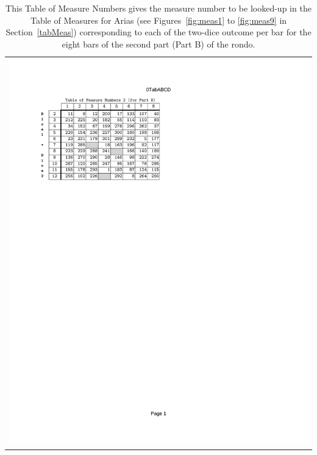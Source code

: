 \documentclass[a4paper,x11names,svgnames,10pt]{article}
\begin{document}
{\begin{table}[H]
	\centering
	\begin{tabular}{c}
		\centering
		\includegraphics[clip=true,trim=0.75in 7.50in 3.75in 1.10in,scale=0.90]{0TAB-B}
	\end{tabular}
	\caption{This Table of Measure Numbers gives the measure number to be looked-up in the Table of Measures for Arias (see Figures~\ref{fig:meas1} to \ref{fig:meas9} in Section~\ref{tabMeas}) corresponding to each of the two-dice outcome per bar for the eight bars of the second part (Part B) of the rondo.}
	\label{tab:find2}
\end{table}

}
\end{document}
